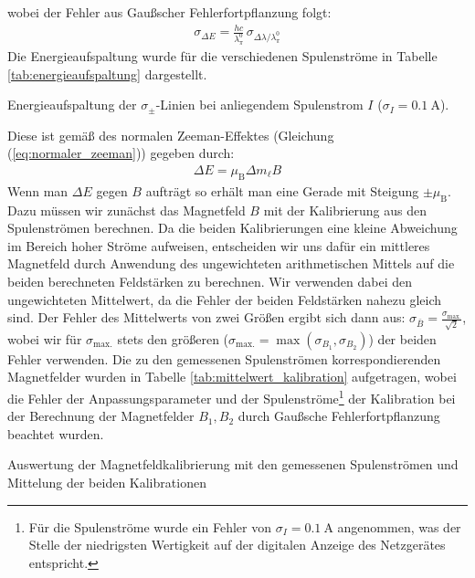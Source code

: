 \documentclass[11pt, a4paper]{article}
\begin{document}
wobei der Fehler aus Gaußscher Fehlerfortpflanzung folgt:
\begin{align*}
	\sigma_{\Delta E} = \frac{h c}{\lambda_\pi^0} \, \sigma_{\Delta \lambda / \lambda_\pi^0}
\end{align*}
Die Energieaufspaltung wurde für die verschiedenen Spulenströme in Tabelle \ref{tab:energieaufspaltung} dargestellt.
\begin{table}[h]
	\centering
	
	\caption{Energieaufspaltung der $\sigma_\pm$-Linien bei anliegendem Spulenstrom $I$ ($\sigma_I = \SI{0.1}{\ampere}$).}
	\label{tab:energieaufspaltung}
\end{table}
Diese ist gemäß des normalen Zeeman-Effektes (Gleichung (\ref{eq:normaler_zeeman})) gegeben durch:
\begin{align}
	\Delta E = \mu_\mathrm{B} \Delta m_\ell B
	\label{eq:normaler_zeeman_auswertung}
\end{align}
Wenn man $\Delta E$ gegen $B$ aufträgt so erhält man eine Gerade mit Steigung $\pm \mu_\mathrm{B}$.
Dazu müssen wir zunächst das Magnetfeld $B$ mit der Kalibrierung aus den Spulenströmen berechnen.
Da die beiden Kalibrierungen eine kleine Abweichung im Bereich hoher Ströme aufweisen, entscheiden wir uns dafür ein mittleres Magnetfeld durch Anwendung des ungewichteten arithmetischen Mittels auf die beiden berechneten Feldstärken zu berechnen.
Wir verwenden dabei den ungewichteten Mittelwert, da die Fehler der beiden Feldstärken nahezu gleich sind.
Der Fehler des Mittelwerts von zwei Größen ergibt sich dann aus: $\sigma_{\bar{B}} = \frac{\sigma_\mathrm{max.}}{\sqrt{2}}$, wobei wir für $\sigma_\mathrm{max.}$ stets den größeren ($\sigma_\mathrm{max.} = \max(\sigma_{B_1}, \sigma_{B_2}) $) der beiden Fehler verwenden.
Die zu den gemessenen Spulenströmen korrespondierenden Magnetfelder wurden in Tabelle \ref{tab:mittelwert_kalibration} aufgetragen, wobei die Fehler der Anpassungsparameter und der Spulenströme\footnote{Für die Spulenströme wurde ein Fehler von $\sigma_I = \SI{0.1}{\ampere}$ angenommen, was der Stelle der niedrigsten Wertigkeit auf der digitalen Anzeige des Netzgerätes entspricht.} der Kalibration bei der Berechnung der Magnetfelder $B_1, B_2$ durch Gaußsche Fehlerfortpflanzung beachtet wurden.
\begin{table}[h]
	\centering
	
	\caption{Auswertung der Magnetfeldkalibrierung mit den gemessenen Spulenströmen und Mittelung der beiden Kalibrationen}
	\label{tab:mittelwert_kalibration}
\end{table}
\end{document}
